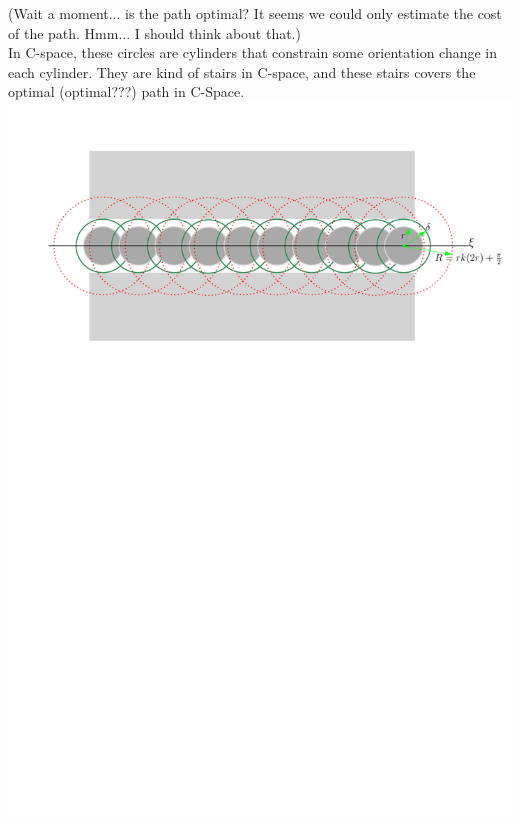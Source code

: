 \documentclass[12pt]{article}
\begin{document}
  (Wait a moment... is the path optimal? It seems we could only estimate the cost of the path. Hmm... I should think about that.)\\

  In C-space, these circles are cylinders that constrain some orientation change in each cylinder. They are kind of stairs in C-space, and these stairs covers the optimal (optimal???) path in C-Space. \\
  
  \hspace*{-2cm}\includegraphics[scale=0.84]{CirclesCoveredPath}\\
\end{document}
